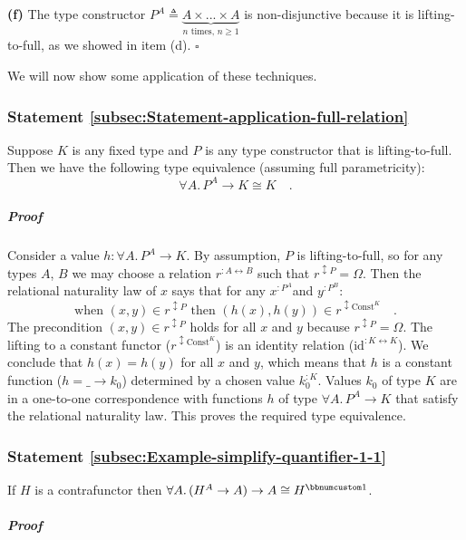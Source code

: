 \textbf{(f)} The type constructor $P^{A}\triangleq\underbrace{A\times...\times A}_{n\text{ times, }n\geq1}$
is non-disjunctive because it is lifting-to-full, as we showed in
item (d). $\square$

We will now show some application of these techniques.

\subsubsection{Statement \label{subsec:Statement-application-full-relation}\ref{subsec:Statement-application-full-relation}}

Suppose $K$ is any fixed type and $P$ is any type constructor that
is lifting-to-full. Then we have the following type equivalence (assuming
full parametricity):
\[
\forall A.\,P^{A}\rightarrow K\cong K\quad.
\]


\subparagraph{Proof}

Consider a value $h:\forall A.\,P^{A}\rightarrow K$. By assumption,
$P$ is lifting-to-full, so for any types $A$, $B$ we may choose
a relation $r^{:A\leftrightarrow B}$ such that $r^{\updownarrow P}=\Omega$.
Then the relational naturality law of $x$ says that for any $x^{:P^{A}}$and
$y^{:P^{B}}$:
\[
\text{when }(x,y)\in r^{\updownarrow P}\text{ then }(h(x),h(y))\in r^{\updownarrow\text{Const}^{K}}\quad.
\]
The precondition $(x,y)\in r^{\updownarrow P}$ holds for all $x$
and $y$ because $r^{\updownarrow P}=\Omega$. The lifting to a constant
functor ($r^{\updownarrow\text{Const}^{K}}$) is an identity relation
($\text{id}^{:K\leftrightarrow K}$). We conclude that $h(x)=h(y)$
for all $x$ and $y$, which means that $h$ is a constant function
($h=\_\rightarrow k_{0}$) determined by a chosen value $k_{0}^{:K}$.
Values $k_{0}$ of type $K$ are in a one-to-one correspondence with
functions $h$ of type $\forall A.\,P^{A}\rightarrow K$ that satisfy
the relational naturality law. This proves the required type equivalence. 

\subsubsection{Statement \label{subsec:Example-simplify-quantifier-1-1}\ref{subsec:Example-simplify-quantifier-1-1}}

If $H$ is a contrafunctor then $\forall A.\,(H^{A}\rightarrow A)\rightarrow A\cong H^{\bbnum 1}$.

\subparagraph{Proof}


